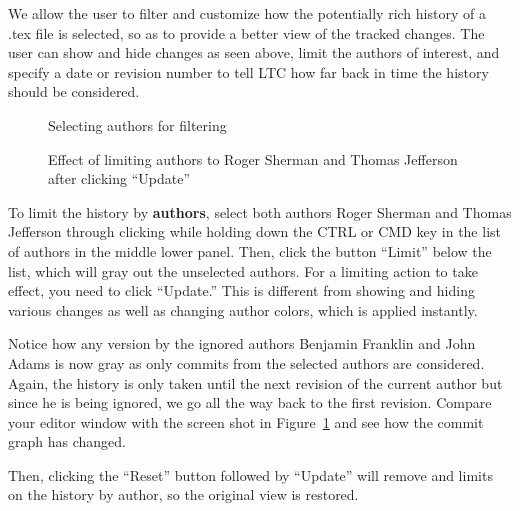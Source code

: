 We allow the user to filter and customize how the potentially rich history of a .tex file is selected, so as to provide a better view of the tracked changes.  The user can show and hide changes as seen above, limit the authors of interest, and specify a date or revision number to tell LTC how far back in time the history should be considered.


\begin{figure}
\centering
  \begin{minipage}[t]{0.35\linewidth}
  \centering
  \caption{Selecting authors for filtering} \label{fig:editor-select-authors}
  \end{minipage}%
\hspace{0.04\linewidth}%
  \begin{minipage}[t]{0.61\linewidth}
  \centering
  \caption[Effect of limiting authors]{Effect of limiting authors to Roger Sherman and Thomas Jefferson after clicking ``Update''} \label{fig:editor-limit-authors}
  \end{minipage}  
\end{figure}
To limit the history by \textbf{authors}, select both authors Roger Sherman and Thomas Jefferson through clicking while holding down the CTRL or CMD key in the list of authors in the middle lower panel.  Then, click the button ``Limit'' below the list, which will gray out the unselected authors.  For a limiting action to take effect, you need to click ``Update.''  This is different from showing and hiding various changes as well as changing author colors, which is applied instantly.

Notice how any version by the ignored authors Benjamin Franklin and John Adams is now gray as only commits from the selected authors are considered.  Again, the history is only taken until the next revision of the current author but since he is being ignored, we go all the way back to the first revision. Compare your editor window with the screen shot in Figure~\ref{fig:editor-limit-authors} and see how the commit graph has changed.

Then, clicking the ``Reset'' button followed by ``Update'' will remove and limits on the history by author, so the original view is restored.

